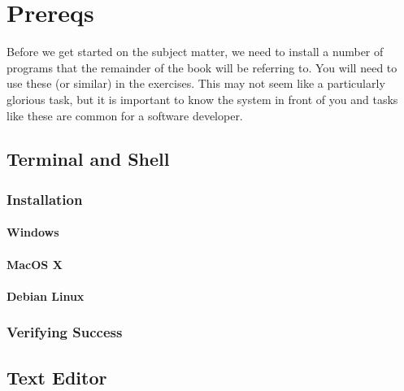 \chapter{Prereqs}

Before we get started on the subject matter, we need to install a number of programs that the remainder of the book will be referring to. You will need to use these (or similar) in the exercises. This may not seem like a particularly glorious task, but it is important to know the system in front of you and tasks like these are common for a software developer.

\section{Terminal and Shell}

\subsection{Installation}
\subsubsection{Windows}
\subsubsection{MacOS X}
\subsubsection{Debian Linux}
\subsection{Verifying Success}

\section{Text Editor}


